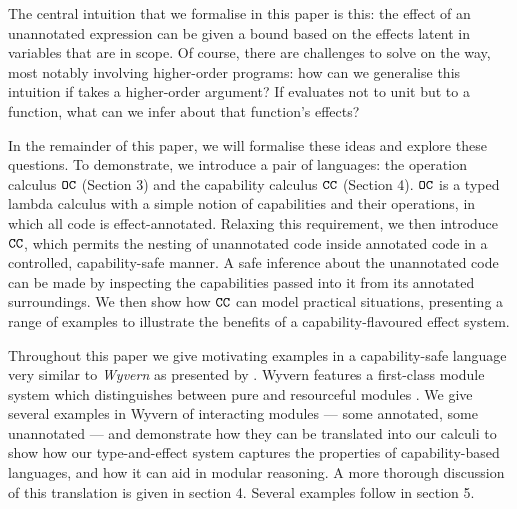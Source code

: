 The central intuition that we formalise in this paper is this: the effect of an unannotated expression can be given a bound based on the effects latent in variables that are in scope.
Of course, there are challenges to solve on the way, most notably involving higher-order programs: how can we generalise this intuition if  takes a higher-order argument?
If  evaluates not to unit but to a function, what can we infer about that function's effects?

In the remainder of this paper, we will formalise these ideas and explore these questions.
To demonstrate, we introduce a pair of languages: the operation calculus $\mathtt{OC}$ (Section 3) and the capability calculus $\mathtt{CC}$ (Section 4).
$\mathtt{OC}$ is a typed lambda calculus with a simple notion of capabilities and their operations, in which all code is effect-annotated.
Relaxing this requirement, we then introduce $\mathtt{CC}$, which permits the nesting of unannotated code inside annotated code in a controlled, capability-safe manner.
A safe inference about the unannotated code can be made by inspecting the capabilities passed into it from its annotated surroundings.
We then show how $\mathtt{CC}$ can model practical situations, presenting a range of examples to illustrate the benefits of a capability-flavoured effect system.

Throughout this paper we give motivating examples in a capability-safe language very similar to \textit{Wyvern} as presented by \citet{nistor13}. Wyvern features a first-class module system which distinguishes between pure and resourceful modules \cite{kurilova16}. We give several examples in Wyvern of interacting modules --- some annotated, some unannotated --- and demonstrate how they can be translated into our calculi to show how our type-and-effect system captures the properties of capability-based languages, and how it can aid in modular reasoning. A more thorough discussion of this translation is given in section 4. Several examples follow in section 5.




